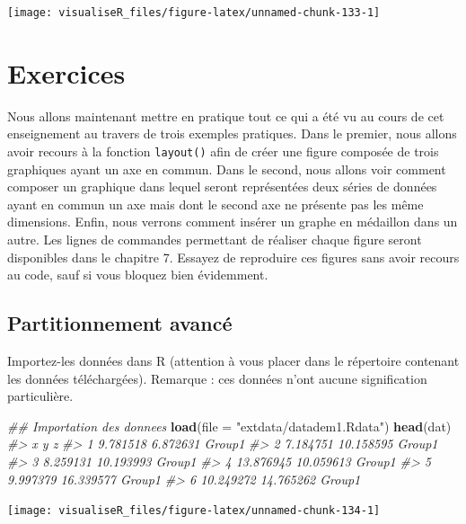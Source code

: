 \documentclass[]{article}
\newenvironment{Shaded}{\begin{snugshade}}{\end{snugshade}}
\newcommand{\CommentTok}[1]{\textcolor[rgb]{0.56,0.35,0.01}{\textit{#1}}}
\newcommand{\DataTypeTok}[1]{\textcolor[rgb]{0.13,0.29,0.53}{#1}}
\newcommand{\KeywordTok}[1]{\textcolor[rgb]{0.13,0.29,0.53}{\textbf{#1}}}
\newcommand{\NormalTok}[1]{#1}
\newcommand{\StringTok}[1]{\textcolor[rgb]{0.31,0.60,0.02}{#1}}
\begin{document}
\begin{center}\texttt{[image: visualiseR\_files/figure-latex/unnamed-chunk-133-1]} \end{center}

\hypertarget{exercices}{%
\section{Exercices}\label{exercices}}

Nous allons maintenant mettre en pratique tout ce qui a été vu au cours de cet enseignement au travers de trois exemples pratiques. Dans le premier, nous allons avoir recours à la fonction \texttt{layout()} afin de créer une figure composée de trois graphiques ayant un axe en commun. Dans le second, nous allons voir comment composer un graphique dans lequel seront représentées deux séries de données ayant en commun un axe mais dont le second axe ne présente pas les même dimensions. Enfin, nous verrons comment insérer un graphe en médaillon dans un autre. Les lignes de commandes permettant de réaliser chaque figure seront disponibles dans le chapitre 7. Essayez de reproduire ces figures sans avoir recours au code, sauf si vous bloquez bien évidemment.

\hypertarget{partitionnement-avancuxe9-1}{%
\subsection{Partitionnement avancé}\label{partitionnement-avancuxe9-1}}

Importez-les données dans R (attention à vous placer dans le répertoire contenant les données téléchargées). Remarque : ces données n'ont aucune signification particulière.

\begin{Shaded}
\begin{Highlighting}[]
\CommentTok{## Importation des donnees}
\KeywordTok{load}\NormalTok{(}\DataTypeTok{file =} \StringTok{"extdata/datadem1.Rdata"}\NormalTok{)}
\KeywordTok{head}\NormalTok{(dat)}
\CommentTok{#>           x         y      z}
\CommentTok{#> 1  9.781518  6.872631 Group1}
\CommentTok{#> 2  7.184751 10.158595 Group1}
\CommentTok{#> 3  8.259131 10.193993 Group1}
\CommentTok{#> 4 13.876945 10.059613 Group1}
\CommentTok{#> 5  9.997379 16.339577 Group1}
\CommentTok{#> 6 10.249272 14.765262 Group1}
\end{Highlighting}
\end{Shaded}

\begin{center}\texttt{[image: visualiseR\_files/figure-latex/unnamed-chunk-134-1]} \end{center}
\end{document}
